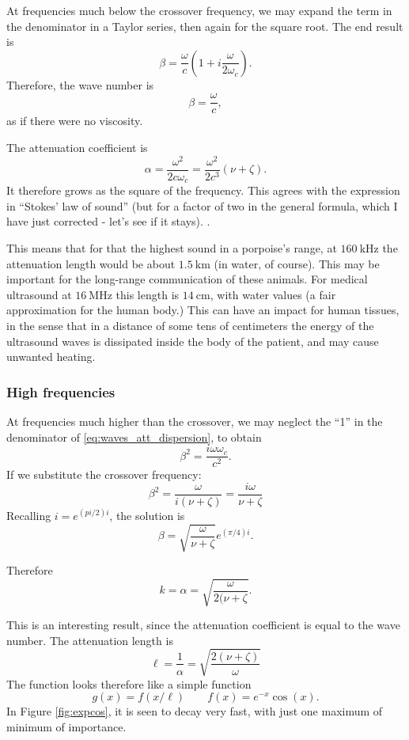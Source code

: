 At frequencies much below the crossover frequency, we may expand the
term in the denominator in a Taylor series, then again for the square
root. The end result is
\[
\beta = \frac{\omega}{c} \left(1 + i   \frac{\omega}{2 \omega_c}\right).
\]
%
Therefore, the wave number is
\[
\beta = \frac{\omega}{c},
\]
as if there were no viscosity.

The attenuation coefficient is
\[ \alpha = \frac{\omega^2}{2 c\omega_c}=
\frac{\omega^2}{2 c^3}(\nu+\zeta). \]
%
It therefore grows as the square of the frequency.  This agrees with
the expression in ``Stokes' law of sound'' \cite{kp:SloS}
(but for a factor of two in the general formula, which I have just
corrected - let's see if it stays).  .

This means that for that the highest sound in a porpoise's range, at
$\SI{160}{\kilo\hertz}$ the attenuation length would be about
$\SI{1.5}{\kilo\meter}$ (in water, of course). This may be important
for the long-range communication of these animals. For medical
ultrasound at $\SI{16}{\mega\hertz}$ this length is
$\SI{14}{\centi\meter}$, with water values (a fair approximation for
the human body.) This can have an impact for human tissues, in the
sense that in a distance of some tens of centimeters the energy of the
ultrasound waves is dissipated inside the body of the patient, and may
cause unwanted heating.

\subsubsection{High frequencies}

At frequencies much higher than the crossover, we may neglect the
``1'' in the denominator of \ref{eq:waves_att_dispersion}, to obtain
\[
\beta^2 = \frac{i \omega\omega_c}{c^2} .
\]
If we substitute the crossover frequency:
\[
\beta^2 = \frac{\omega}{i(\nu+\zeta)} =\frac{i \omega}{\nu+\zeta} 
\]
Recalling $i = e^{(pi/2)i} $, the solution is
\[
\beta =\sqrt{ \frac{\omega}{ \nu + \zeta }} e^{(\pi/4)i}.
\]

Therefore
\[
k=\alpha =\sqrt{\frac{\omega}{ 2 (\nu+ \zeta}}.
\]

This is an interesting result, since the attenuation coefficient is
equal to the wave number. The attenuation length is
\[
\ell= \frac{1}{\alpha}=\sqrt{\frac{ 2 (\nu+ \zeta)}{\omega}}
\]
The function looks therefore like a simple function
\[
g(x)= f(x/\ell) \qquad  f(x) = e^{-x}\cos(x) .
\]
In Figure \ref{fig:expcos}, it is seen to decay very fast, with just
one maximum of minimum of importance.




